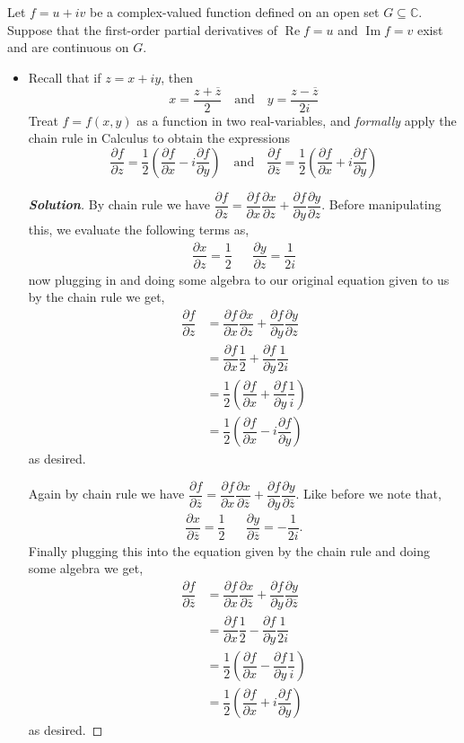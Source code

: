 \documentclass[11pt]{article}
\newenvironment{problem}[2][Problem\!]{\begin{trivlist}
\item[\hskip \labelsep {\bfseries #1}\hskip \labelsep {\bfseries #2}]}{\end{trivlist}}
\newenvironment{solution}{\begin{proof}[\textbf{\textit{Solution}}] }{\end{proof}}
\newcommand{\cc}{\mathbb C}   %
\newcommand{\conj}[1]{\overline{#1}}
\newcommand{\pdiv}[2]{\dfrac{\partial #1}{\partial #2}}
\renewcommand{\Re}{\operatorname{Re}}
\renewcommand{\Im}{\operatorname{Im}}
\newcommand{\lrp}[1]{\left(#1\right)}
\begin{document}
\newpage  %

\begin{problem}{4.2}
Let $f = u + iv$ be a complex-valued function defined on an open set $G \subseteq \cc$. Suppose that the first-order partial derivatives of $\Re f = u$ and $\Im f = v$ exist and are continuous on $G$.

\begin{itemize}[itemsep=3em]
\item[(a)] Recall that if $z = x + iy$, then
\[x = \frac{z + \overline{z}}{2} \quad \text{and} \quad y = \frac{z - \overline{z}}{2i}\]
Treat $f = f(x,y)$ as a function in two real-variables, and \emph{formally} apply the chain rule in Calculus to obtain the expressions
\[\frac{\partial f}{\partial z} = \frac{1}{2}\left(\frac{\partial f}{\partial x} - i\frac{\partial f}{\partial y}\right) \quad \text{and} \quad \frac{\partial f}{\partial \overline{z}} = \frac{1}{2}\left(\frac{\partial f}{\partial x} + i\frac{\partial f}{\partial y}\right)\]
\begin{solution}
  By chain rule we have $\pdiv{f}{z} = \pdiv{f}{x}\pdiv{x}{z} + \pdiv{f}{y}\pdiv{y}{z}$. Before manipulating this, we evaluate the following terms as,
  \begin{align*}
    \pdiv{x}{z} = \dfrac{1}{2} && \pdiv{y}{z} = \dfrac{1}{2i}
  \end{align*}
  now plugging in and doing some algebra to our original equation given to us by the chain rule we get,
  \begin{align*}
    \pdiv{f}{z} &= \pdiv{f}{x}\pdiv{x}{z} + \pdiv{f}{y}\pdiv{y}{z} \\
    &= \pdiv{f}{x}\dfrac{1}{2} + \pdiv{f}{y}\dfrac{1}{2i} \\
    &= \dfrac{1}{2}\lrp{\pdiv{f}{x} + \pdiv{f}{y} \dfrac{1}{i}} \\
    &= \dfrac{1}{2}\lrp{\pdiv{f}{x} - i \pdiv{f}{y} }
  \end{align*}
  as desired. 

  Again by chain rule we have $\pdiv{f}{\conj{z}} = \pdiv{f}{x}\pdiv{x}{\conj{z}} + \pdiv{f}{y}\pdiv{y}{\conj{z}}$. Like before we note that,
  \begin{align*}
    \pdiv{x}{\conj{z}} = \dfrac{1}{2} && \pdiv{y}{\conj{z}} = -\dfrac{1}{2i}.
  \end{align*}
  Finally plugging this into the equation given by the chain rule and doing some algebra we get,
  \begin{align*}
    \pdiv{f}{\conj{z}} &= \pdiv{f}{x}\pdiv{x}{\conj{z}} + \pdiv{f}{y}\pdiv{y}{\conj{z}} \\
    &= \pdiv{f}{x}\dfrac{1}{2} - \pdiv{f}{y}\dfrac{1}{2i} \\
    &= \dfrac{1}{2}\lrp{\pdiv{f}{x} - \pdiv{f}{y}\dfrac{1}{i}} \\
    &= \dfrac{1}{2}\lrp{\pdiv{f}{x} + i \pdiv{f}{y}}
  \end{align*}
  as desired.
  

\end{solution}
\end{itemize}
\end{problem}
\end{document}

